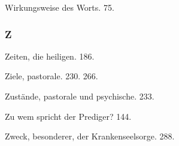Wirkungsweise des Worts. 75.

\subsubsection{Z}

Zeiten, die heiligen. 186.

Ziele, pastorale. 230. 266.

Zustände, pastorale und psychische. 233.

Zu wem spricht der Prediger? 144.

Zweck, besonderer, der Krankenseelsorge. 288.

